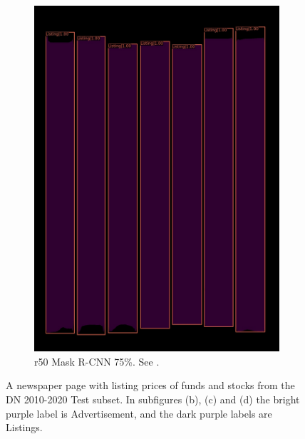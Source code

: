 \documentclass[oneside, english, bibtex]{kththesis}
\begin{document}
\begin{figure}[!htb]
\begin{adjustbox}{center,max size={\textwidth}{0.9\textheight}}
{\begin{subfigure}{0.6\textwidth}
\includegraphics[width=\linewidth]{figures/labels-vanilla-0.75/zk6UnuL.jpg}
  \caption{r50 Mask R-CNN 75\%. See . }
  \label{fig:zk6UnuL_pred}
\end{subfigure}}
\end{adjustbox}
  \caption{A newspaper page with listing prices of funds and stocks from the DN 2010-2020 Test subset. In subfigures (b), (c) and (d) the bright purple label is Advertisement, and the dark purple labels are Listings.}
\label{fig:zk6UnuL}
\end{figure}

\clearpage
\end{document}
